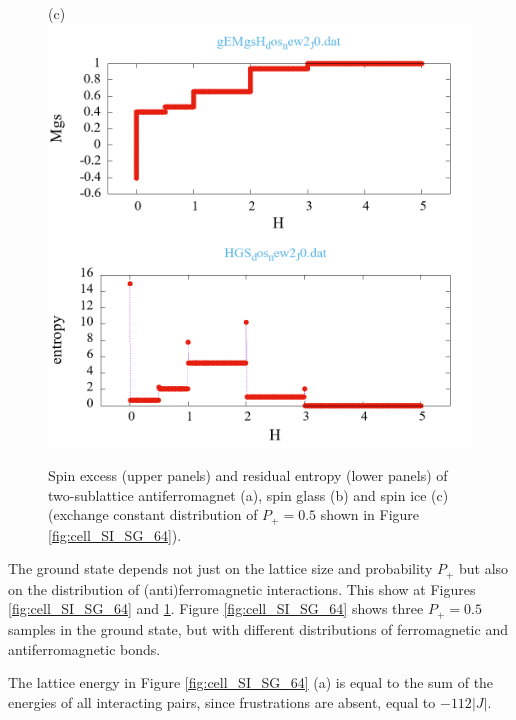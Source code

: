 \documentclass[preprint,12pt]{elsarticle}
\begin{document}
\begin{figure}[H]
\begin{minipage}[h]{0.32\linewidth}
		\end{minipage}
		\hfill
		\begin{minipage}[h]{0.32\linewidth}
			\centering
			\hspace{1cm} (c)
			\includegraphics[width=1\linewidth]{pictures/_multiplot_SI64_J0}
		\end{minipage}
		
		\caption{Spin excess (upper panels) and residual entropy (lower panels) of two-sublattice antiferromagnet (a), spin glass (b) and spin ice (c) (exchange constant distribution of $P_+ = 0.5$ shown in Figure \ref{fig:cell_SI_SG_64}).}
		\label{fig:_multiplot_SI_SG_64}
		
	\end{figure}
	
	The ground state depends not just on the lattice size and probability $P_+$ but also on the distribution of (anti)ferromagnetic interactions. This show at Figures \ref{fig:cell_SI_SG_64} and \ref{fig:_multiplot_SI_SG_64}. Figure \ref{fig:cell_SI_SG_64} shows three $P_+ = 0.5$ samples in the ground state, but with different distributions of ferromagnetic and antiferromagnetic bonds.
	
	The lattice energy in Figure \ref{fig:cell_SI_SG_64} (a) is equal to the sum of the energies of all interacting pairs, since frustrations are absent, equal to $-112|J|$.
	
\end{document}
